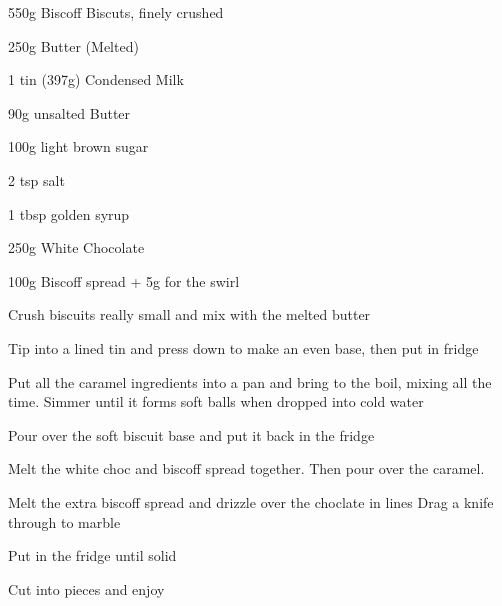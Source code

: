 \label{recipe:biscoff_millionaires_shortbread}


\begin{ingredients}

\item 550g Biscoff Biscuts, finely crushed
\item 250g Butter (Melted)
\item 1 tin (397g) Condensed Milk
\item 90g unsalted Butter
\item 100g light brown sugar
\item 2 tsp salt
\item 1 tbsp golden syrup
\item 250g White Chocolate
\item 100g Biscoff spread + 5g for the
swirl
\end{ingredients}


\begin{method}
  	Crush biscuits really small and mix with the melted butter 

Tip into a lined tin and press down to make an even base, then put
in fridge

Put all the caramel ingredients into a pan and bring to the  boil,
mixing all the time. Simmer until it forms soft balls when dropped
into cold water

Pour over the soft biscuit base and put it back in the fridge

Melt the white choc and biscoff spread together. Then pour over
the caramel.

Melt the extra biscoff spread and drizzle over the choclate in lines
Drag a knife through to marble

Put in the fridge until solid

Cut into pieces and enjoy
  
\end{method}


